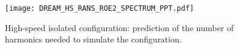 

\begin{figure}[htp]
  \centering
  \texttt{[image: DREAM\_HS\_RANS\_ROE2\_SPECTRUM\_PPT.pdf]}
  \caption{High-speed isolated configuration: prediction of the number
  of harmonics needed to simulate the configuration.}
  \label{fig:DREAM_HS_RANS_ROE2_SPECTRUM_PPT}
\end{figure}


